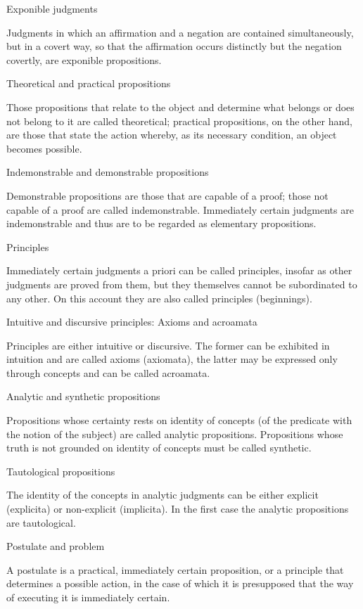 Exponible judgments

Judgments in which an affirmation and a negation
are contained simultaneously, but in a covert way,
so that the affirmation occurs distinctly
but the negation covertly, are exponible propositions.

Theoretical and practical propositions

Those propositions that relate to the object
and determine what belongs or does not belong to it
are called theoretical;
practical propositions, on the other hand,
are those that state the action whereby,
as its necessary condition,
an object becomes possible.

Indemonstrable and demonstrable propositions

Demonstrable propositions are those that are capable of a proof;
those not capable of a proof are called indemonstrable.
Immediately certain judgments are indemonstrable
and thus are to be regarded as elementary propositions.

Principles

Immediately certain judgments a priori can be called principles,
insofar as other judgments are proved from them,
but they themselves cannot be subordinated to any other.
On this account they are also called principles (beginnings).

Intuitive and discursive principles: Axioms and acroamata

Principles are either intuitive or discursive.
The former can be exhibited in intuition
and are called axioms (axiomata),
the latter may be expressed only through concepts
and can be called acroamata.

Analytic and synthetic propositions

Propositions whose certainty rests on identity of concepts
(of the predicate with the notion of the subject)
are called analytic propositions.
Propositions whose truth is not grounded on identity of concepts
must be called synthetic.

Tautological propositions

The identity of the concepts in analytic judgments can be
either explicit (explicita) or non-explicit (implicita).
In the first case the analytic propositions are tautological.

Postulate and problem

A postulate is a practical, immediately certain proposition,
or a principle that determines a possible action,
in the case of which it is presupposed that
the way of executing it is immediately certain.

